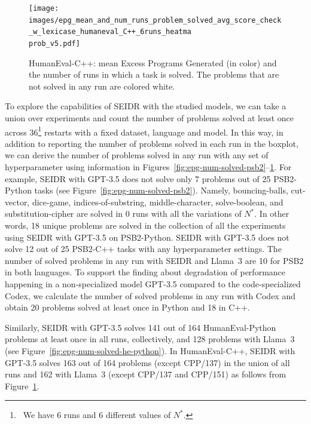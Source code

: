 \begin{figure}[hbt!]
  \centering
  \texttt{[image: images/epg\_mean\_and\_num\_runs\_problem\_solved\_avg\_score\_check\_w\_lexicase\_humaneval\_C++\_6runs\_heatma\\prob\_v5.pdf]}  %
  \vspace{-4pt}
  \caption{HumanEval-C++: mean Excess Programs Generated (in color) and the number of runs in which a task is solved. The problems that are not solved in any run are colored white.}
  \label{fig:epg-num-solved-he-c++}
  \vspace{-12pt}
\end{figure}



To explore the capabilities of SEIDR with the studied models, we can take a union over experiments and count the number of problems solved at least once across 36\footnote{~We have 6 runs and 6 different values of $N^*.$} restarts with a fixed dataset, language and model.
In this way, in addition to reporting the number of problems solved in each run in the boxplot, we can derive the number of problems solved in any run with any set of hyperparameter using information in Figures~\ref{fig:epg-num-solved-psb2}--\ref{fig:epg-num-solved-he-c++}.
For example, SEIDR with GPT-3.5 does not solve only 7 problems out of 25 PSB2-Python tasks (see Figure~\ref{fig:epg-num-solved-psb2}).
Namely, bouncing-balls, cut-vector, dice-game, indices-of-substring, middle-character, solve-boolean, and substitution-cipher are solved in 0 runs with all the variations of $N^*$.
In other words, 18 unique problems are solved in the collection of all the experiments using SEIDR with GPT-3.5 on PSB2-Python. 
SEIDR with GPT-3.5 does not solve 12 out of 25 PSB2-C++ tasks with any hyperparameter settings. 
The number of solved problems in any run with SEIDR and Llama~3 are 10 for PSB2 in both languages. 
To support the finding about degradation of performance happening in a non-specialized model GPT-3.5 compared to the code-specialized Codex, we calculate the number of solved problems in any run with Codex and obtain 20 problems solved at least once in Python and 18 in C++. 

Similarly, SEIDR with GPT-3.5 solves 141 out of 164 HumanEval-Python problems at least once in all runs, collectively, and 128 problems with Llama~3 (see Figure~\ref{fig:epg-num-solved-he-python}).
In HumanEval-C++, SEIDR with GPT-3.5 solves 163 out of 164 problems (except CPP/137) in the union of all runs and 162 with Llama~3 (except CPP/137 and CPP/151) as follows from Figure~\ref{fig:epg-num-solved-he-c++}.


